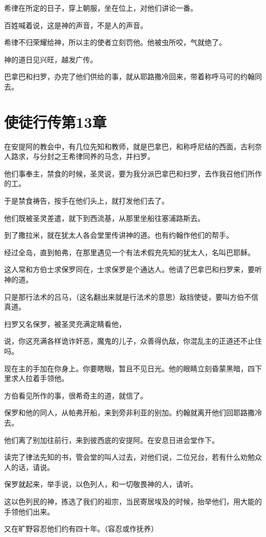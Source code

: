 \documentclass[12pt,oneside]{book}
\begin{document}
希律在所定的日子，穿上朝服，坐在位上，对他们讲论一番。

百姓喊着说，这是神的声音，不是人的声音。

希律不归荣耀给神，所以主的使者立刻罚他。他被虫所咬，气就绝了。

神的道日见兴旺，越发广传。

巴拿巴和扫罗，办完了他们供给的事，就从耶路撒冷回来，带着称呼马可的约翰同去。

\chapter{使徒行传第13章}
在安提阿的教会中，有几位先知和教师，就是巴拿巴，和称呼尼结的西面，古利奈人路求，与分封之王希律同养的马念，并扫罗。

他们事奉主，禁食的时候，圣灵说，要为我分派巴拿巴和扫罗，去作我召他们所作的工。

于是禁食祷告，按手在他们头上，就打发他们去了。

他们既被圣灵差遣，就下到西流基，从那里坐船往塞浦路斯去。

到了撒拉米，就在犹太人各会堂里传讲神的道。也有约翰作他们的帮手。

经过全岛，直到帕弗，在那里遇见一个有法术假充先知的犹太人，名叫巴耶稣。

这人常和方伯士求保罗同在，士求保罗是个通达人。他请了巴拿巴和扫罗来，要听神的道。

只是那行法术的吕马，（这名翻出来就是行法术的意思）敌挡使徒，要叫方伯不信真道。

扫罗又名保罗，被圣灵充满定睛看他，

说，你这充满各样诡诈奸恶，魔鬼的儿子，众善得仇敌，你混乱主的正道还不止住吗。

现在主的手加在你身上。你要瞎眼，暂且不见日光。他的眼睛立刻昏蒙黑暗，四下里求人拉着手领他。

方伯看见所作的事，很希奇主的道，就信了。

保罗和他的同人，从帕弗开船，来到旁非利亚的别加。约翰就离开他们回耶路撒冷去。

他们离了别加往前行，来到彼西底的安提阿。在安息日进会堂作下。

读完了律法先知的书，管会堂的叫人过去，对他们说，二位兄台，若有什么劝勉众人的话，请说。

保罗就起来，举手说，以色列人，和一切敬畏神的人，请听。

这以色列民的神，拣选了我们的祖宗，当民寄居埃及的时候，抬举他们，用大能的手领他们出来。

又在旷野容忍他们约有四十年。（容忍或作抚养）
\end{document}
